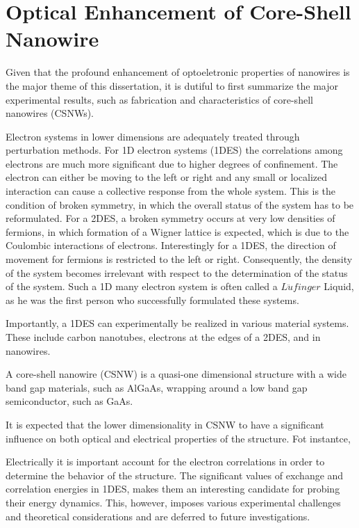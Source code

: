 \chapter{Optical Enhancement of Core-Shell Nanowire} \label{data}

Given that the profound enhancement of optoeletronic properties of nanowires is
the major theme of this dissertation, it is dutiful to first summarize the
major experimental results, such as fabrication and characteristics of
core-shell nanowires (CSNWs).

Electron systems in lower dimensions are adequately treated through
perturbation methods. For 1D electron systems (1DES) the correlations among
electrons are much more significant due to higher degrees of confinement. The
electron can either be moving to the left or right and any small or localized
interaction can cause a collective response from the whole system. This is the
condition of broken symmetry, in which the overall status of the system has to
be reformulated. For a 2DES, a broken symmetry occurs at very low densities of
fermions, in which formation of a Wigner lattice is expected, which is due to
the Coulombic interactions of electrons. Interestingly for a 1DES, the
direction of movement for fermions is restricted to the left or right.
Consequently, the density of the system becomes irrelevant with respect to the
determination of the status of the system. Such a 1D many electron system is
often called a $L\ddot{u}finger$ Liquid, as he was the first person who
successfully formulated these systems.

Importantly, a 1DES can experimentally be realized in various material systems.
These include carbon nanotubes, electrons at the edges of a 2DES, and in
nanowires.

A core-shell nanowire (CSNW) is a quasi-one dimensional structure with a wide
band gap materials, such as AlGaAs, wrapping around a low band gap
semiconductor, such as GaAs.

It is expected that the lower dimensionality in CSNW to have a significant
influence on both optical and electrical properties of the structure. Fot
instantce,

Electrically it is important account for the electron correlations in order to
determine the behavior of the structure. The significant values of exchange
and correlation energies in 1DES, makes them an interesting candidate for
probing their energy dynamics. This, however, imposes various experimental
challenges and theoretical considerations and are deferred to future
investigations.

